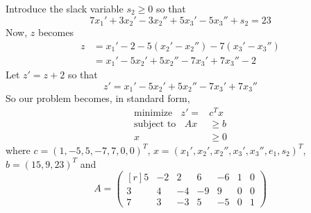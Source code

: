 \documentclass{article}
\begin{document}
Introduce the slack variable $s_2 \geq 0$ so that
\[7x_1' + 3x_2' - 3x_2'' + 5x_3' - 5x_3'' + s_2 = 23\]
Now, $z$ becomes
\begin{align*} 
    z &= x_1' - 2 - 5(x_2' - x_2'') - 7(x_3' - x_3'')\\
    &= x_1' - 5x_2' + 5x_2'' - 7x_3' + 7x_3'' - 2
\end{align*}
Let $z' = z + 2$ so that 
\[z' = x_1' - 5x_2' + 5x_2'' - 7x_3' + 7x_3''\]
So our problem becomes, in standard form,
\begin{align*}
    \text{minimize} \:\:\:\: z' = &c^Tx\\
    \text{subject to} \:\:\:\: Ax &\geq b\\
    x&\geq 0 
\end{align*}
where $c = (1, -5,5, -7, 7, 0, 0)^T$, $x = (x_1', x_2', x_2'', x_3', x_3'', e_1, s_2)^T$, $b = (15, 9, 23)^T$ and
\[A = \begin{pmatrix*}[r]
    5 & -2 & 2 & 6 & -6 & 1 & 0\\
    3 & 4 & -4 & -9 & 9 & 0 & 0\\
    7 & 3 & -3 & 5 & -5 & 0 & 1
\end{pmatrix*}\]
\end{document}

